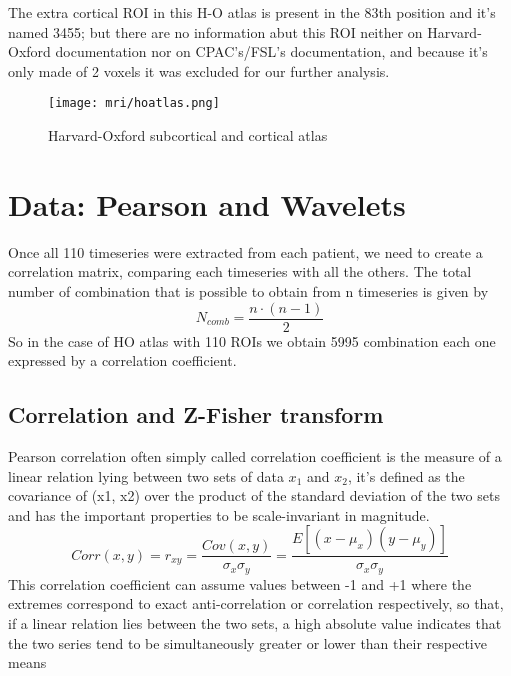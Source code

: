\documentclass[a4paper,11pt]{article}
\begin{document}
The extra cortical ROI in this H-O atlas is present in the 83th position and it's named 3455; but there are no information abut this ROI neither on Harvard-Oxford documentation nor on CPAC's/FSL's documentation, and because it's only made of 2 voxels it was excluded for our further analysis.

\begin{figure}[h]
\centering
\texttt{[image: mri/hoatlas.png]}
\caption{Harvard-Oxford subcortical and cortical atlas}
\label{fig:hoatlas}
\end{figure}





\section{Data: Pearson and Wavelets}
Once all 110 timeseries were extracted from each patient, we need to create a correlation matrix, comparing each timeseries with all the others.
The total number of combination that is possible to obtain from n timeseries is given by
\begin{equation}
N_{comb} = \frac{n\cdot(n-1)}{2}
\end{equation}
So in the case of HO atlas with 110 ROIs we obtain 5995 combination each one expressed by a correlation coefficient.
\subsection{Correlation and Z-Fisher transform}

Pearson correlation often simply called correlation coefficient is the measure of a linear relation lying between two sets of data $x_1$ and $x_2$, it's defined as the covariance of (x1, x2) over the product of the standard deviation of the two sets and has the important properties to be scale-invariant in magnitude.
\begin{equation}
Corr(x, y) = r_{xy}=  \frac{Cov\left( x, y\right)}{\sigma_x \sigma_y} = \frac{E\left[ \left( x - \mu_x \right) \left( y - \mu_y \right)\right]}{\sigma_{x} \sigma_{y}}
\end{equation}
This correlation coefficient can assume values between -1 and +1 where the extremes correspond to exact anti-correlation or correlation respectively, so that, if a linear relation lies between the two sets, a high absolute value indicates that the two series tend to be simultaneously greater or lower than their respective means
\end{document}
